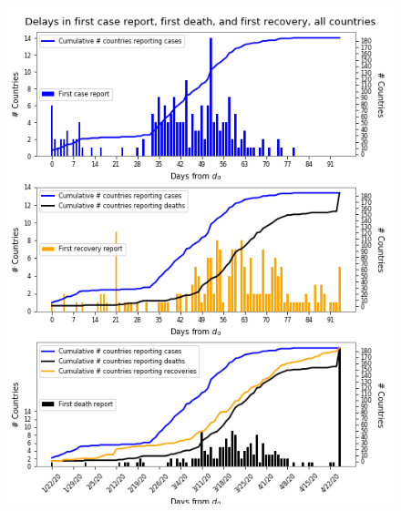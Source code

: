 %
\begin{figure}[h]
\begin{minipage}{0.5\textwidth}
\includegraphics[width=\textwidth]{figures_COVID19_dataAnalysis/dam_COVID19_JHU_reportArrivals_AllCountries}
\end{minipage}%
\begin{minipage}{0.5\textwidth}

\end{minipage}
\end{figure}
